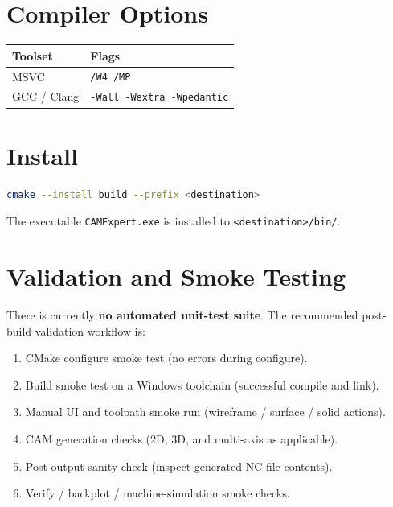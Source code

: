 \documentclass[11pt,a4paper]{article}
\begin{document}
\section{Compiler Options}

\begin{center}
\begin{tabular}{ll}
\hline
\textbf{Toolset} & \textbf{Flags} \\
\hline
MSVC & \texttt{/W4 /MP} \\
GCC / Clang & \texttt{-Wall -Wextra -Wpedantic} \\
\hline
\end{tabular}
\end{center}

\section{Install}

\begin{lstlisting}[language=bash]
cmake --install build --prefix <destination>
\end{lstlisting}

\noindent The executable \texttt{CAMExpert.exe} is installed to
\texttt{<destination>/bin/}.

\section{Validation and Smoke Testing}

There is currently \textbf{no automated unit-test suite}.  The recommended
post-build validation workflow is:

\begin{enumerate}
  \item CMake configure smoke test (no errors during configure).
  \item Build smoke test on a Windows toolchain (successful compile and link).
  \item Manual UI and toolpath smoke run (wireframe / surface / solid actions).
  \item CAM generation checks (2D, 3D, and multi-axis as applicable).
  \item Post-output sanity check (inspect generated NC file contents).
  \item Verify / backplot / machine-simulation smoke checks.
\end{enumerate}
\end{document}
